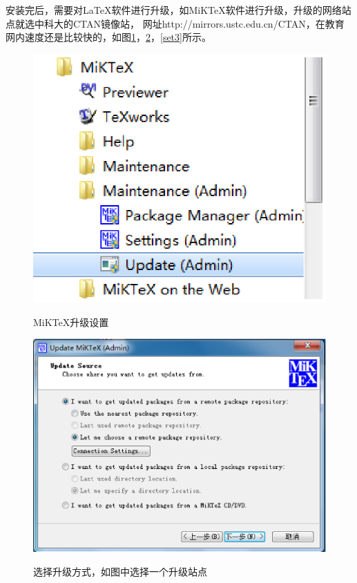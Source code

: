 安装完后，需要对\LaTeX 软件进行升级，如MiKTeX软件进行升级，升级的网络站点就选中科大的CTAN镜像站，
网址http://mirrors.ustc.edu.cn/CTAN，在教育网内速度还是比较快的，如图\ref{set1}，\ref{set2}，\ref{set3}所示。

\begin{figure}[th]
\centering
\includegraphics[scale=0.5]{./Pictures/set1.eps}\\
\caption{MiKTeX升级设置}
\label{set1}
\end{figure}

\begin{figure}[th]
\centering
\includegraphics[scale=0.5]{./Pictures/set2.eps}\\
\caption{选择升级方式，如图中选择一个升级站点}
\label{set2}
\end{figure}

